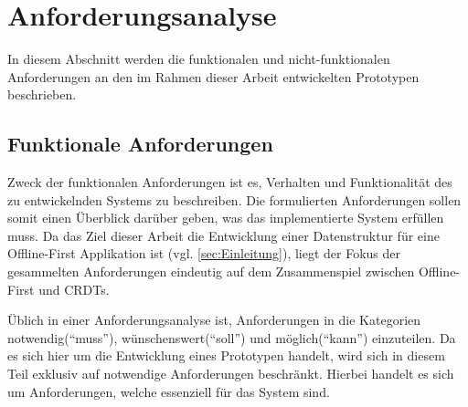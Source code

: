 \documentclass[a4paper, 12pt]{scrreprt}
\begin{document}
\section{Anforderungsanalyse}
\label{sec:anforderungsanalyse}

In diesem Abschnitt werden die funktionalen und nicht-funktionalen Anforderungen an den im Rahmen dieser Arbeit entwickelten Prototypen beschrieben.

\subsection{Funktionale Anforderungen}
\label{sec:funktionaleAnforderungen}
Zweck der funktionalen Anforderungen ist es, Verhalten und Funktionalität des zu entwickelnden Systems zu beschreiben. Die formulierten Anforderungen sollen somit einen Überblick darüber geben, was das implementierte System erfüllen muss. Da das Ziel dieser Arbeit die Entwicklung einer Datenstruktur für eine Offline-First Applikation ist (vgl. \ref{sec:Einleitung}), liegt der Fokus der gesammelten Anforderungen eindeutig auf dem Zusammenspiel zwischen Offline-First und \acp{CRDT}.

Üblich in einer Anforderungsanalyse ist, Anforderungen in die Kategorien notwendig(\enquote{muss}), wünschenswert(\enquote{soll}) und möglich(\enquote{kann}) einzuteilen. Da es sich hier um die Entwicklung eines Prototypen handelt, wird sich in diesem Teil exklusiv auf notwendige Anforderungen beschränkt. Hierbei handelt es sich um Anforderungen, welche essenziell für das System sind.
\end{document}
